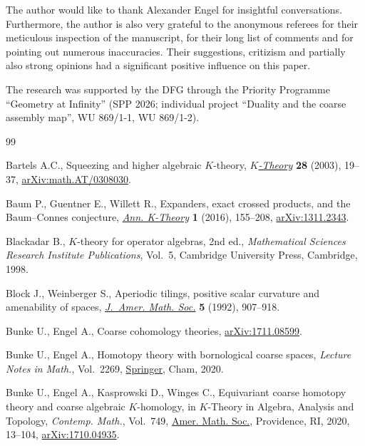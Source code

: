 \documentclass[pdftex]{sigma}
\numberwithin{equation}{section}
\theoremstyle{definition}
\begin{document}
The author would like to thank Alexander Engel for insightful conversations.
Furthermore, the author is also very grateful to the anonymous referees for their meticulous inspection of the manuscript, for their long list of comments and for pointing out numerous inaccuracies.
Their suggestions, critizism and partially also strong opinions had a significant positive influence on this paper.

The research was supported by the DFG through the Priority Programme ``Geometry at Infinity'' (SPP 2026; individual project ``Duality and the coarse assembly map'', WU 869/1-1, WU 869/1-2).

\begin{thebibliography}{99}
\footnotesize\itemsep=0pt

Bartels A.C., Squeezing and higher algebraic {$K$}-theory, \href{https://doi.org/10.1023/A:1024166521174}{\textit{$K$-Theory}}
 \textbf{28} (2003), 19--37, \href{https://arxiv.org/abs/math.AT/0308030}{arXiv:math.AT/0308030}.

Baum P., Guentner E., Willett R., Expanders, exact crossed products, and the
 {B}aum--{C}onnes conjecture, \href{https://doi.org/10.2140/akt.2016.1.155}{\textit{Ann. K-Theory}} \textbf{1} (2016),
 155--208, \href{https://arxiv.org/abs/1311.2343}{arXiv:1311.2343}.

Blackadar B., {$K$}-theory for operator algebras, 2nd ed., \textit{Mathematical Sciences
 Research Institute Publications}, Vol.~5, Cambridge University
 Press, Cambridge, 1998.

Block J., Weinberger S., Aperiodic tilings, positive scalar curvature and
 amenability of spaces, \href{https://doi.org/10.2307/2152713}{\textit{J.~Amer. Math. Soc.}} \textbf{5} (1992),
 907--918.

Bunke U., Engel A., Coarse cohomology theories, \href{https://arxiv.org/abs/1711.08599}{arXiv:1711.08599}.

Bunke U., Engel A., Homotopy theory with bornological coarse spaces,
 \textit{Lecture Notes in Math.}, Vol.~2269, \href{https://doi.org/10.1007/978-3-030-51335-1}{Springer}, Cham, 2020.

Bunke U., Engel A., Kasprowski D., Winges C., Equivariant coarse homotopy
 theory and coarse algebraic {$K$}-homology, in {$K$}-Theory in Algebra,
 Analysis and Topology, \textit{Contemp. Math.}, Vol.~749, \href{https://doi.org/10.1090/conm/749/15068}{Amer. Math. Soc.},
 Providence, RI, 2020, 13--104, \href{https://arxiv.org/abs/1710.04935}{arXiv:1710.04935}.


\end{thebibliography}
\end{document}
